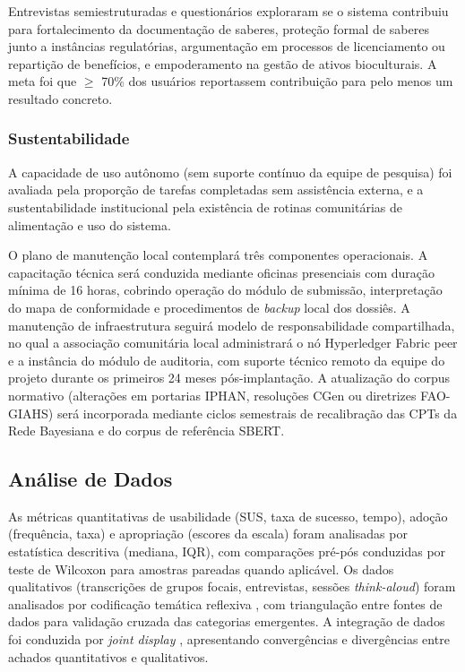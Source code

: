 Entrevistas semiestruturadas e questionários exploraram se o sistema contribuiu para fortalecimento da documentação de saberes, proteção formal de saberes junto a instâncias regulatórias, argumentação em processos de licenciamento ou repartição de benefícios, e empoderamento na gestão de ativos bioculturais. A meta foi que $\geq$ 70\% dos usuários reportassem contribuição para pelo menos um resultado concreto.

\subsubsection{Sustentabilidade}

A capacidade de uso autônomo (sem suporte contínuo da equipe de pesquisa) foi avaliada pela proporção de tarefas completadas sem assistência externa, e a sustentabilidade institucional pela existência de rotinas comunitárias de alimentação e uso do sistema.

O plano de manutenção local contemplará três componentes operacionais. A capacitação técnica será conduzida mediante oficinas presenciais com duração mínima de 16 horas, cobrindo operação do módulo de submissão, interpretação do mapa de conformidade e procedimentos de \textit{backup} local dos dossiês. A manutenção de infraestrutura seguirá modelo de responsabilidade compartilhada, no qual a associação comunitária local administrará o nó Hyperledger Fabric peer e a instância do módulo de auditoria, com suporte técnico remoto da equipe do projeto durante os primeiros 24 meses pós-implantação. A atualização do corpus normativo (alterações em portarias IPHAN, resoluções CGen ou diretrizes FAO-GIAHS) será incorporada mediante ciclos semestrais de recalibração das CPTs da Rede Bayesiana e do corpus de referência SBERT.


\subsection{Análise de Dados}

As métricas quantitativas de usabilidade (SUS, taxa de sucesso, tempo), adoção (frequência, taxa) e apropriação (escores da escala) foram analisadas por estatística descritiva (mediana, IQR), com comparações pré-pós conduzidas por teste de Wilcoxon para amostras pareadas quando aplicável. Os dados qualitativos (transcrições de grupos focais, entrevistas, sessões \textit{think-aloud}) foram analisados por codificação temática reflexiva \cite{Braun2006}, com triangulação entre fontes de dados para validação cruzada das categorias emergentes. A integração de dados foi conduzida por \textit{joint display} \cite{Creswell2018}, apresentando convergências e divergências entre achados quantitativos e qualitativos.


